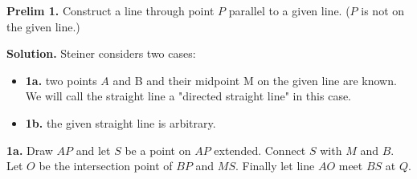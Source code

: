\documentclass[11pt,a4paper]{article}
\begin{document}
\textbf{Prelim 1.} Construct a line through point $P$ parallel to a given line. ($P$ is not on the given line.)

\textbf{Solution.} Steiner considers two cases: 
\begin{itemize}
\item \textbf{1a.} two points $A$ and B and their midpoint M on the given line are known. We will call the straight line a "directed straight line" in this case.
\item \textbf{1b.} the given straight line is arbitrary. 
\end{itemize}

\textbf{1a.} Draw $AP$ and let $S$ be a point on $AP$ extended. Connect $S$ with $M$ and $B$. Let $O$ be the intersection point of $BP$ and $MS$. Finally let line $AO$ meet $BS$ at $Q$.
\end{document}
